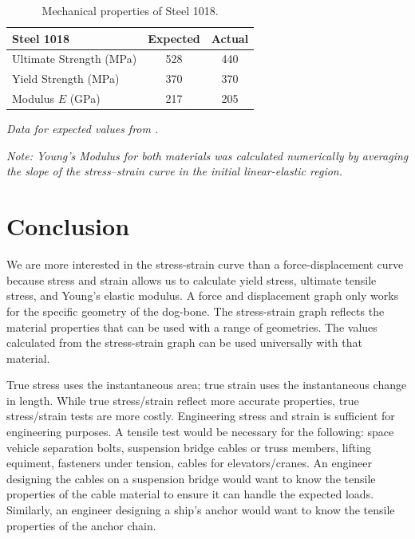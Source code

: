 \documentclass[conf]{new-aiaa} %
\begin{document}
\begin{table}[H]
    \centering
    \renewcommand{\arraystretch}{1.3}
    \begin{tabular}{lcc}
    \toprule
    \textbf{Steel 1018} & Expected & Actual \\
    \midrule
    Ultimate Strength (MPa) & 528 & 440 \\ 
    Yield Strength (MPa)    & 370 & 370 \\ 
    Modulus $E$ (GPa)       & 217 & 205 \\ 
    \bottomrule
    \end{tabular}
    \caption{Mechanical properties of Steel 1018.}
    \footnotesize\textit{Data for expected values from \cite{matweb1018}.}
    \label{tab:steel}
\end{table}

\noindent\footnotesize\textit{Note: Young’s Modulus for both materials was calculated numerically by averaging the slope of the stress–strain curve in the initial linear-elastic region.}

\FloatBarrier

\section{Conclusion}
We are more interested in the stress-strain curve than a force-displacement curve because stress and strain allows us to calculate yield stress, ultimate tensile stress, and Young's elastic modulus.
A force and displacement graph only works for the specific geometry of the dog-bone.
The stress-strain graph reflects the material properties that can be used with a range of geometries.
The values calculated from the stress-strain graph can be used universally with that material.

True stress uses the instantaneous area; true strain uses the instantaneous change in length.
While true stress/strain reflect more accurate properties, true stress/strain tests are more costly.
Engineering stress and strain is sufficient for engineering purposes.
A tensile test would be necessary for the following: space vehicle separation bolts, suspension bridge cables or truss members, lifting equiment, fasteners under tension, cables for elevators/cranes.
An engineer designing the cables on a suspension bridge would want to know the tensile properties of the cable material to ensure it can handle the expected loads.
Similarly, an engineer designing a ship's anchor would want to know the tensile properties of the anchor chain.
\end{document}
